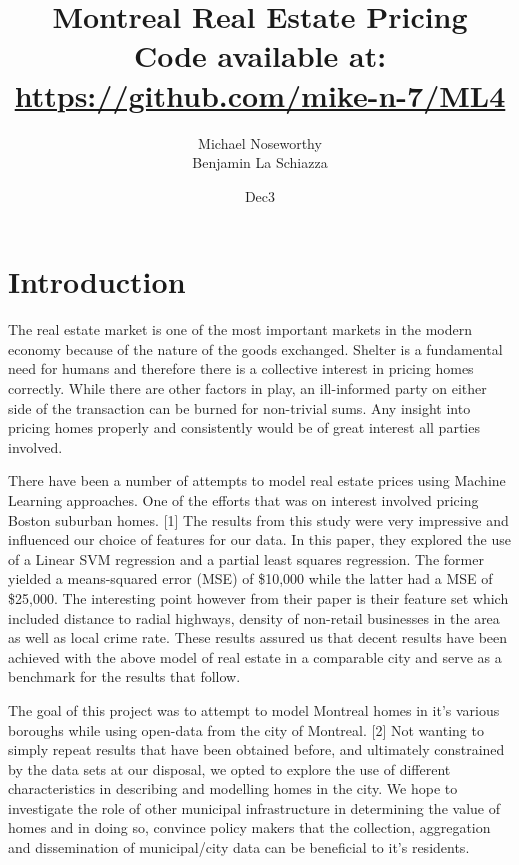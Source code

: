 \documentclass{acm_proc_article-sp}
\begin{document}
\title{Montreal Real Estate Pricing \\
{\normalsize Code available at: \url{https://github.com/mike-n-7/ML4}}} 
\subtitle{}

\author{
\alignauthor 
Michael Noseworthy \\
	\affaddr{}
\alignauthor Benjamin La Schiazza\\
}

\date{Dec3}

\maketitle
\begin{abstract}

\end{abstract}

\section{Introduction}

	The real estate market is one of the most important markets in the modern economy because of the nature of the goods exchanged. Shelter is a fundamental need for humans and therefore there is a collective interest in pricing homes correctly. While there are other factors in play, an ill-informed party on either side of the transaction can be burned for non-trivial sums. Any insight into pricing homes properly and consistently would be of great interest all parties involved. 
	
	There have been a number of attempts to model real estate prices using Machine Learning approaches. One of the efforts that was on interest involved pricing Boston suburban homes. [1] The results from this study were very impressive and influenced our choice of features for our data. In this paper, they explored the use of a Linear SVM regression and a partial least squares regression. The former yielded a means-squared error (MSE) of \$10,000 while the latter had a MSE of \$25,000. The interesting point however from their paper is their feature set which included distance to radial highways, density of non-retail businesses in the area as well as local crime rate. These results assured us that decent results have been achieved with the above model of real estate in a comparable city and serve as a benchmark for the results that follow. 
	
	The goal of this project was to attempt to model Montreal homes in it's various boroughs while using open-data from the city of Montreal. [2] Not wanting to simply repeat results that have been obtained before, and ultimately constrained by the data sets at our disposal, we opted to explore the use of different characteristics in describing and modelling homes in the city. We hope to investigate the role of other municipal infrastructure in determining the value of homes and in doing so, convince policy makers that the collection, aggregation and dissemination of municipal/city data can be beneficial to it's residents.
\end{document}
